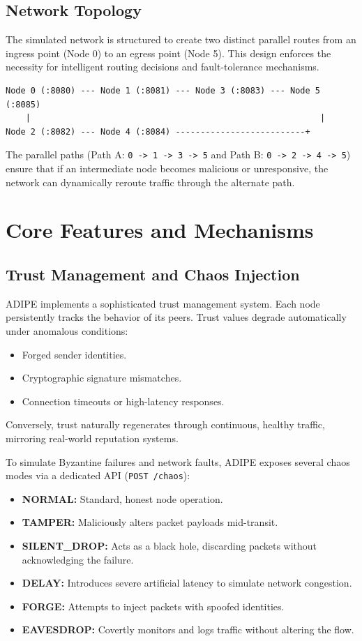 \documentclass[12pt]{article}
\begin{document}
\subsection{Network Topology}
The simulated network is structured to create two distinct parallel routes from an ingress point (Node 0) to an egress point (Node 5). This design enforces the necessity for intelligent routing decisions and fault-tolerance mechanisms.

\begin{verbatim}
Node 0 (:8080) --- Node 1 (:8081) --- Node 3 (:8083) --- Node 5 (:8085)
    |                                                          |
Node 2 (:8082) --- Node 4 (:8084) --------------------------+
\end{verbatim}

The parallel paths (Path A: \texttt{0 -> 1 -> 3 -> 5} and Path B: \texttt{0 -> 2 -> 4 -> 5}) ensure that if an intermediate node becomes malicious or unresponsive, the network can dynamically reroute traffic through the alternate path.

\section{Core Features and Mechanisms}

\subsection{Trust Management and Chaos Injection}
ADIPE implements a sophisticated trust management system. Each node persistently tracks the behavior of its peers. Trust values degrade automatically under anomalous conditions:
\begin{itemize}
    \item Forged sender identities.
    \item Cryptographic signature mismatches.
    \item Connection timeouts or high-latency responses.
\end{itemize}
Conversely, trust naturally regenerates through continuous, healthy traffic, mirroring real-world reputation systems.

To simulate Byzantine failures and network faults, ADIPE exposes several chaos modes via a dedicated API (\texttt{POST /chaos}):
\begin{itemize}
    \item \textbf{NORMAL:} Standard, honest node operation.
    \item \textbf{TAMPER:} Maliciously alters packet payloads mid-transit.
    \item \textbf{SILENT\_DROP:} Acts as a black hole, discarding packets without acknowledging the failure.
    \item \textbf{DELAY:} Introduces severe artificial latency to simulate network congestion.
    \item \textbf{FORGE:} Attempts to inject packets with spoofed identities.
    \item \textbf{EAVESDROP:} Covertly monitors and logs traffic without altering the flow.
\end{itemize}
\end{document}
